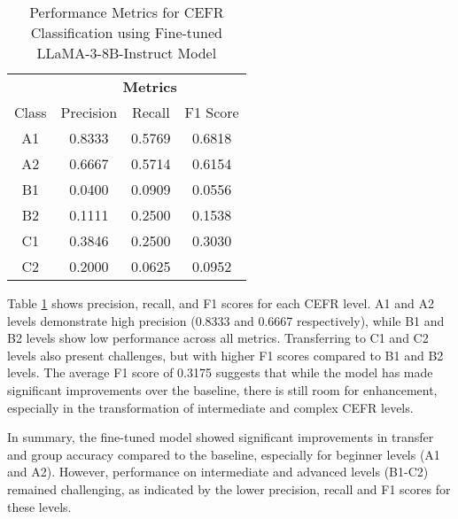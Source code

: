 \begin{table}[ht]
    \centering
    \begin{tabular}{c|ccc}
        & \multicolumn{3}{c}{\textbf{Metrics}} \\
        Class & Precision & Recall & F1 Score \\
        \hline
        A1 & 0.8333 & 0.5769 & 0.6818 \\
        A2 & 0.6667 & 0.5714 & 0.6154 \\
        B1 & \cellcolor[rgb]{1,0.9,0.9}0.0400 & \cellcolor[rgb]{1,0.9,0.9}0.0909 & \cellcolor[rgb]{1,0.9,0.9}0.0556 \\
        B2 & \cellcolor[rgb]{1,0.9,0.9}0.1111 & \cellcolor[rgb]{1,0.9,0.9}0.2500 & \cellcolor[rgb]{1,0.9,0.9}0.1538 \\
        C1 & 0.3846 & \cellcolor[rgb]{1,0.9,0.9}0.2500 & 0.3030 \\
        C2 & \cellcolor[rgb]{1,0.9,0.9}0.2000 & \cellcolor[rgb]{1,0.9,0.9}0.0625 & \cellcolor[rgb]{1,0.9,0.9}0.0952
    \end{tabular}
    \caption{Performance Metrics for CEFR Classification using Fine-tuned LLaMA-3-8B-Instruct Model}
    \label{tab:cefr_performance_metrics_finetuned}
\end{table}
Table \ref{tab:cefr_performance_metrics_finetuned} shows precision, recall, and F1 scores for each CEFR level. A1 and A2 levels demonstrate high precision (0.8333 and 0.6667 respectively), while B1 and B2 levels show low performance across all metrics. Transferring to C1 and C2 levels also present challenges, but with higher F1 scores compared to B1 and B2 levels.
The average F1 score of 0.3175 suggests that while the model has made significant improvements over the baseline, there is still room for enhancement, especially in the transformation of intermediate and complex CEFR levels.

In summary, the fine-tuned model showed significant improvements in transfer and group accuracy compared to the baseline, especially for beginner levels (A1 and A2). However, performance on intermediate and advanced levels (B1-C2) remained challenging, as indicated by the lower precision, recall and F1 scores for these levels.